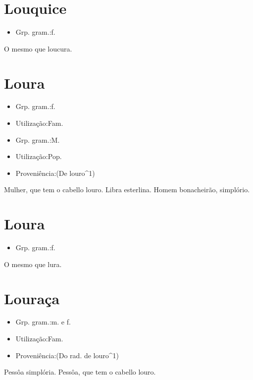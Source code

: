 \section{Louquice}
\begin{itemize}
\item {Grp. gram.:f.}
\end{itemize}
O mesmo que \textunderscore loucura\textunderscore .
\section{Loura}
\begin{itemize}
\item {Grp. gram.:f.}
\end{itemize}
\begin{itemize}
\item {Utilização:Fam.}
\end{itemize}
\begin{itemize}
\item {Grp. gram.:M.}
\end{itemize}
\begin{itemize}
\item {Utilização:Pop.}
\end{itemize}
\begin{itemize}
\item {Proveniência:(De \textunderscore louro\textunderscore ^1)}
\end{itemize}
Mulher, que tem o cabello louro.
Libra esterlina.
Homem bonacheirão, simplório.
\section{Loura}
\begin{itemize}
\item {Grp. gram.:f.}
\end{itemize}
O mesmo que \textunderscore lura\textunderscore .
\section{Louraça}
\begin{itemize}
\item {Grp. gram.:m.  e  f.}
\end{itemize}
\begin{itemize}
\item {Utilização:Fam.}
\end{itemize}
\begin{itemize}
\item {Proveniência:(Do rad. de \textunderscore louro\textunderscore ^1)}
\end{itemize}
Pessôa simplória.
Pessôa, que tem o cabello louro.
